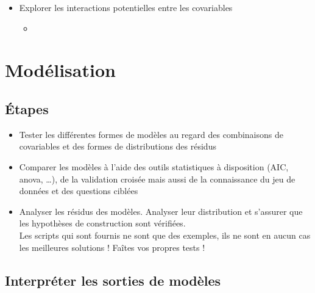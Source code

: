 \documentclass[french,a4paper]{article}
\providecommand{\tightlist}{%
  \setlength{\itemsep}{0pt}\setlength{\parskip}{0pt}}
\begin{document}
\begin{itemize}
\tightlist
\item
  Explorer les interactions potentielles entre les covariables

  \begin{itemize}
  \item
  \end{itemize}
\end{itemize}

\hypertarget{modelisation}{%
\section{Modélisation}\label{modelisation}}

\hypertarget{etapes-1}{%
\subsection{Étapes}\label{etapes-1}}


\begin{itemize}
\tightlist
\item
  Tester les différentes formes de modèles au regard des combinaisons de
  covariables et des formes de distributions des résidus
\item
  Comparer les modèles à l'aide des outils statistiques à disposition
  (AIC, anova, \ldots{}), de la validation croisée mais aussi de la
  connaissance du jeu de données et des questions ciblées
\item
  Analyser les résidus des modèles. Analyser leur distribution et
  s'assurer que les hypothèses de construction sont vérifiées.\\
  \nopandoc{\begin{redbox}} Les scripts qui sont fournis ne sont que des
  exemples, ils ne sont en aucun cas les meilleures solutions ! Faîtes
  vos propres tests ! \nopandoc{\end{redbox}}
\end{itemize}

\hypertarget{interpreter-les-sorties-de-modeles}{%
\subsection{Interpréter les sorties de
modèles}\label{interpreter-les-sorties-de-modeles}}
\end{document}
